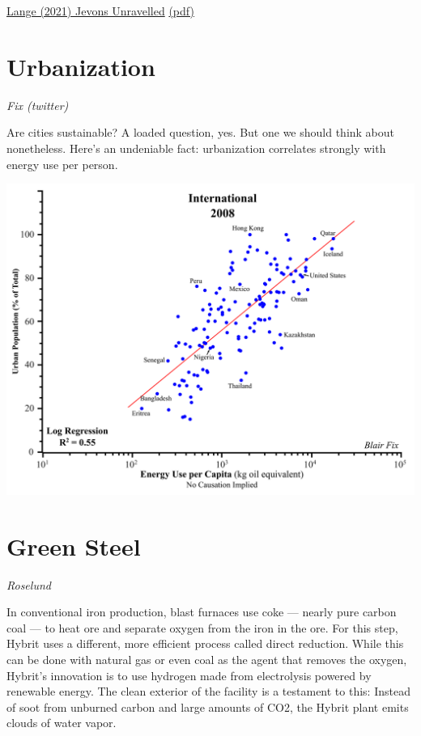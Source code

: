 \documentclass[
]{book}
\begin{document}
\href{https://www.sciencedirect.com/science/article/pii/S221462962100075X}{Lange (2021) Jevons Unravelled}
\href{pdf/Lange_2021_Jevons_Unravelled.pdf}{(pdf)}

\hypertarget{urbanization}{%
\section{Urbanization}\label{urbanization}}

\emph{Fix (twitter)}

Are cities sustainable? A loaded question, yes. But one we should think about nonetheless.
Here's an undeniable fact: urbanization correlates strongly with energy use per person.

\includegraphics{fig/Fix_2008_Urban_Energy_Use.png}

\hypertarget{green-steel}{%
\section{Green Steel}\label{green-steel}}

\emph{Roselund}

In conventional iron production, blast furnaces use coke --- nearly pure carbon coal --- to heat ore and separate oxygen from the iron in the ore. For this step, Hybrit uses a different, more efficient process called direct reduction. While this can be done with natural gas or even coal as the agent that removes the oxygen, Hybrit's innovation is to use hydrogen made from electrolysis powered by renewable energy. The clean exterior of the facility is a testament to this: Instead of soot from unburned carbon and large amounts of CO2, the Hybrit plant emits clouds of water vapor.
\end{document}
